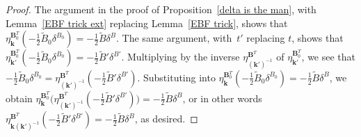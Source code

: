 \documentclass[10pt]{article}
\theoremstyle{definition}
\theoremstyle{remark}
\numberwithin{equation}{section}
\newcommand{\0}{{\mathbf{0}}}
\newcommand{\kk}{{\boldsymbol{k}}}
\newcommand{\tB}{{\widetilde{B}}}
\newcommand{\BB}{\mathbf{B}}
\begin{document}
\begin{proof}
The argument in the proof of Proposition~\ref{delta is the man}, with Lemma~\ref{EBF trick ext} replacing Lemma~\ref{EBF trick}, shows that $\eta^{\BB_0^T}_\kk(-\frac12\tB_0\delta^{B_0})=-\frac12\tB\delta^B$.
%
%
%
%
The same argument, with~$t'$ replacing $t$, shows that $\eta^{\BB_0^T}_{\kk'}(-\frac12\tB_0\delta^{B_0})=-\frac12\tB'\delta^{B'}$.
Multiplying by the inverse $\eta^{\BB^T}_{(\kk')^{-1}}$ of $\eta^{\BB_0^T}_{\kk'}$, we see that $-\frac12\tB_0\delta^{B_0}=\eta^{\BB^T}_{(\kk')^{-1}}(-\frac12\tB'\delta^{B'})$.
Substituting into $\eta^{\BB_0^T}_\kk(-\frac12\tB_0\delta^{B_0})=-\frac12\tB\delta^B$, we obtain $\eta^{\BB_0^T}_\kk\big(\eta^{\BB^T}_{(\kk')^{-1}}(-\frac12\tB'\delta^{B'})\big)=-\frac12\tB\delta^B$, or in other words $\eta^{\BB^T}_{\kk(\kk')^{-1}}(-\frac12\tB'\delta^{B'})=-\frac12\tB\delta^B$, as desired.
\end{proof}
\end{document}
